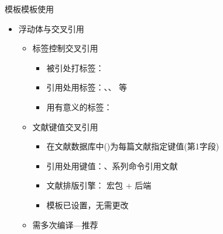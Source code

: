 \documentclass[fontset = adobe, xcolor=svgnames, t, aspectratio=169]{ctexbeamer}
\begin{document}
\begin{frame}{\nwafuthesis 模板}{模板使用}
  \stretchon
  \begin{itemize}
  \item 浮动体与交叉引用
    \begin{itemize}
    \item \alert{标签}控制交叉引用
      \begin{itemize}
      \item 被引处打标签：\texinline{\label}
      \item 引用处用标签：\alert{\texinline{\autoref}}、\texinline{\ref}、
        \texinline{\eqref}等
      \item 用有意义的标签：\texinline{\label{eq:euler-lagrange-eq}}
      \end{itemize}
    \item 文献\alert{键值}交叉引用
      \begin{itemize}
      \item 在文献数据库中()为每篇文献指定\alert{键值}(第1字段)
      \item 引用处用键值：、系列命令引用文献
      \item 文献排版引擎： 宏包 +  后端
      \item 模板已设置，\alert{无需更改}
      \end{itemize} 
    \item 需多次编译---推荐       
    \end{itemize}
  \end{itemize}  
  \stretchoff
\end{frame}
\end{document}
